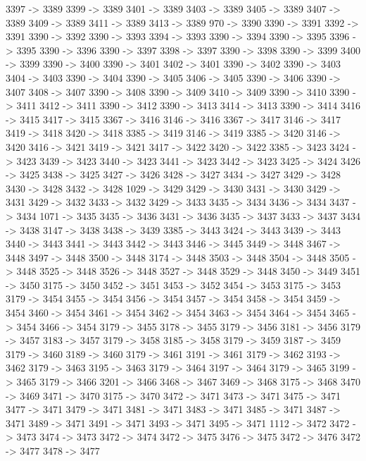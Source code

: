 {	3397 -> 3389
	3399 -> 3389
	3401 -> 3389
	3403 -> 3389
	3405 -> 3389
	3407 -> 3389
	3409 -> 3389
	3411 -> 3389
	3413 -> 3389
	970 -> 3390
	3390 -> 3391
	3392 -> 3391
	3390 -> 3392
	3390 -> 3393
	3394 -> 3393
	3390 -> 3394
	3390 -> 3395
	3396 -> 3395
	3390 -> 3396
	3390 -> 3397
	3398 -> 3397
	3390 -> 3398
	3390 -> 3399
	3400 -> 3399
	3390 -> 3400
	3390 -> 3401
	3402 -> 3401
	3390 -> 3402
	3390 -> 3403
	3404 -> 3403
	3390 -> 3404
	3390 -> 3405
	3406 -> 3405
	3390 -> 3406
	3390 -> 3407
	3408 -> 3407
	3390 -> 3408
	3390 -> 3409
	3410 -> 3409
	3390 -> 3410
	3390 -> 3411
	3412 -> 3411
	3390 -> 3412
	3390 -> 3413
	3414 -> 3413
	3390 -> 3414
	3416 -> 3415
	3417 -> 3415
	3367 -> 3416
	3146 -> 3416
	3367 -> 3417
	3146 -> 3417
	3419 -> 3418
	3420 -> 3418
	3385 -> 3419
	3146 -> 3419
	3385 -> 3420
	3146 -> 3420
	3416 -> 3421
	3419 -> 3421
	3417 -> 3422
	3420 -> 3422
	3385 -> 3423
	3424 -> 3423
	3439 -> 3423
	3440 -> 3423
	3441 -> 3423
	3442 -> 3423
	3425 -> 3424
	3426 -> 3425
	3438 -> 3425
	3427 -> 3426
	3428 -> 3427
	3434 -> 3427
	3429 -> 3428
	3430 -> 3428
	3432 -> 3428
	1029 -> 3429
	3429 -> 3430
	3431 -> 3430
	3429 -> 3431
	3429 -> 3432
	3433 -> 3432
	3429 -> 3433
	3435 -> 3434
	3436 -> 3434
	3437 -> 3434
	1071 -> 3435
	3435 -> 3436
	3431 -> 3436
	3435 -> 3437
	3433 -> 3437
	3434 -> 3438
	3147 -> 3438
	3438 -> 3439
	3385 -> 3443
	3424 -> 3443
	3439 -> 3443
	3440 -> 3443
	3441 -> 3443
	3442 -> 3443
	3446 -> 3445
	3449 -> 3448
	3467 -> 3448
	3497 -> 3448
	3500 -> 3448
	3174 -> 3448
	3503 -> 3448
	3504 -> 3448
	3505 -> 3448
	3525 -> 3448
	3526 -> 3448
	3527 -> 3448
	3529 -> 3448
	3450 -> 3449
	3451 -> 3450
	3175 -> 3450
	3452 -> 3451
	3453 -> 3452
	3454 -> 3453
	3175 -> 3453
	3179 -> 3454
	3455 -> 3454
	3456 -> 3454
	3457 -> 3454
	3458 -> 3454
	3459 -> 3454
	3460 -> 3454
	3461 -> 3454
	3462 -> 3454
	3463 -> 3454
	3464 -> 3454
	3465 -> 3454
	3466 -> 3454
	3179 -> 3455
	3178 -> 3455
	3179 -> 3456
	3181 -> 3456
	3179 -> 3457
	3183 -> 3457
	3179 -> 3458
	3185 -> 3458
	3179 -> 3459
	3187 -> 3459
	3179 -> 3460
	3189 -> 3460
	3179 -> 3461
	3191 -> 3461
	3179 -> 3462
	3193 -> 3462
	3179 -> 3463
	3195 -> 3463
	3179 -> 3464
	3197 -> 3464
	3179 -> 3465
	3199 -> 3465
	3179 -> 3466
	3201 -> 3466
	3468 -> 3467
	3469 -> 3468
	3175 -> 3468
	3470 -> 3469
	3471 -> 3470
	3175 -> 3470
	3472 -> 3471
	3473 -> 3471
	3475 -> 3471
	3477 -> 3471
	3479 -> 3471
	3481 -> 3471
	3483 -> 3471
	3485 -> 3471
	3487 -> 3471
	3489 -> 3471
	3491 -> 3471
	3493 -> 3471
	3495 -> 3471
	1112 -> 3472
	3472 -> 3473
	3474 -> 3473
	3472 -> 3474
	3472 -> 3475
	3476 -> 3475
	3472 -> 3476
	3472 -> 3477
	3478 -> 3477
}
